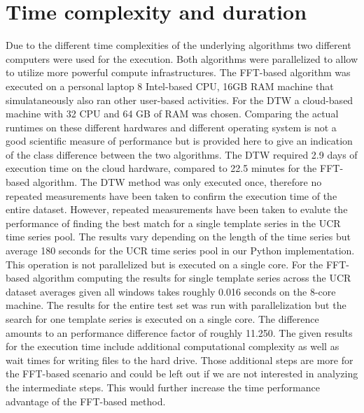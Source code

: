 \documentclass[phd,black, hidelinks]{PrincetonThesis}
\begin{document}
\section{Time complexity and duration}
\label{sec:org3a965c2}
Due to the different time complexities of the underlying algorithms two different computers were used for the execution. Both algorithms were parallelized to allow to utilize more powerful compute infrastructures. The FFT-based algorithm was executed on a personal laptop 8 Intel-based CPU, 16GB RAM machine that simulataneously also ran other user-based activities. For the DTW a cloud-based machine with 32 CPU and 64 GB of RAM was chosen. Comparing the actual runtimes on these different hardwares and different operating system is not a good scientific measure of performance but is provided here to give an indication of the class difference between the two algorithms. The DTW required 2.9 days of execution time on the cloud hardware, compared to 22.5 minutes for the FFT-based algorithm. The DTW method was only executed once, therefore no repeated measurements have been taken to confirm the execution time of the entire dataset. However, repeated measurements have been taken to evalute the performance of finding the best match for a single template series in the UCR time series pool. The results vary depending on the length of the time series but average 180 seconds for the UCR time series pool in our Python implementation. This operation is not parallelized but is executed on a single core. For the FFT-based algorithm computing the results for single template series across the UCR dataset averages given all windows takes roughly 0.016 seconds on the 8-core machine. The results for the entire test set was run with parallelization but the search for one template series is executed on a single core. The difference amounts to an performance difference factor of roughly 11.250. The given results for the execution time include additional computational complexity as well as wait times for writing files to the hard drive. Those additional steps are more for the FFT-based scenario and could be left out if we are not interested in analyzing the intermediate steps. This would further increase the time performance advantage of the FFT-based method.
\end{document}
